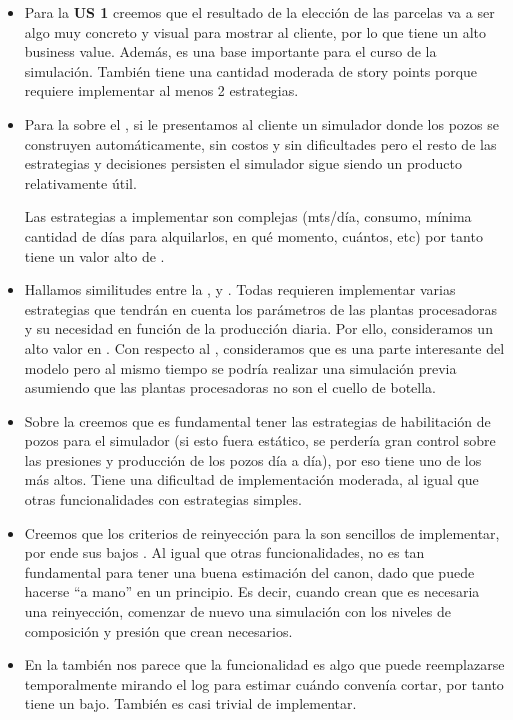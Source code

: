 \begin{itemize}
  \item Para la \textbf{US 1} creemos que el resultado de la elección de las parcelas va a ser algo muy concreto y visual para mostrar al cliente, por lo que tiene un alto business value. Además, es una base importante para el curso de la simulación.
  También tiene una cantidad moderada de story points porque requiere implementar al menos 2 estrategias.

    \item Para la  sobre el \BV, si le presentamos al cliente un simulador donde los pozos se construyen automáticamente, sin costos y sin dificultades pero el resto de las estrategias y decisiones persisten el simulador sigue siendo un producto relativamente útil.

	Las estrategias a implementar son complejas (mts/día, consumo, mínima cantidad de días para alquilarlos, en qué momento, cuántos, etc) por tanto tiene
    un valor alto de \SP.

	\item Hallamos similitudes entre la ,  y . Todas requieren implementar varias estrategias que tendrán en cuenta los parámetros de las plantas procesadoras y su necesidad en función de la producción diaria. Por ello, consideramos un alto valor en \SP. Con respecto al \BV, consideramos que es una parte interesante del modelo pero al mismo tiempo se podría realizar una simulación previa asumiendo que las plantas procesadoras no son el cuello de botella.

    \item Sobre la  creemos que es fundamental tener las estrategias de habilitación de pozos para el simulador (si esto fuera estático, se perdería gran control sobre las presiones y producción de los pozos día a día), por eso tiene uno de los \BV{} más altos. Tiene una dificultad de implementación moderada, al igual que otras funcionalidades con estrategias simples.

    \item Creemos que los criterios de reinyección para la  son sencillos
    de implementar, por ende sus bajos \SP. Al igual que otras funcionalidades,
    no es tan fundamental para tener una buena estimación del canon,
    dado que puede hacerse ``a mano'' en un principio. Es decir, cuando crean que es necesaria una reinyección, comenzar de nuevo una simulación con los niveles de composición y presión que crean necesarios.

    \item En la  también nos parece que la funcionalidad es algo que puede reemplazarse temporalmente mirando el log para estimar cuándo convenía cortar, por tanto tiene un \BV{} bajo. También es casi trivial de implementar.


\end{itemize}
